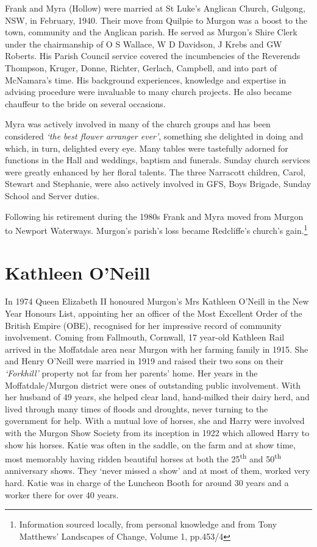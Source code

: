 Frank and Myra (Hollow) were married at St Luke's Anglican Church, Gulgong, NSW, in February, 1940. Their move from Quilpie to Murgon was a boost to the town, community and the Anglican parish. He served as Murgon's Shire Clerk under the chairmanship of O S Wallace, W D Davidson, J Krebs and GW Roberts. His Parish Council service covered the incumbencies of the Reverends Thompson, Kruger, Donne, Richter, Gerlach, Campbell, and into part of McNamara's time. His background experiences, knowledge and expertise in advising procedure were invaluable to many church projects. He also became chauffeur to the bride on several occasions.



Myra was actively involved in many of the church groups and has been considered \emph{`the best flower arranger ever'}, something she delighted in doing and which, in turn, delighted every eye. Many tables were tastefully adorned for functions in the Hall and weddings, baptism and funerals. Sunday church services were greatly enhanced by her floral talents. The three Narracott children, Carol, Stewart and Stephanie, were also actively involved in GFS, Boys Brigade, Sunday School and Server duties.



Following his retirement during the 1980s Frank and Myra moved from Murgon to Newport Waterways. Murgon's parish's loss became Redcliffe's church's gain.\footnote{Information sourced locally, from personal knowledge and from Tony Matthews' Landscapes of Change, Volume 1, pp.453/4}


\section{Kathleen O'Neill}



In 1974 Queen Elizabeth II honoured Murgon's Mrs Kathleen O'Neill in the New Year Honours List, appointing her an officer of the Most Excellent Order of the British Empire (OBE), recognised for her impressive record of community involvement. Coming from Fallmouth, Cornwall, 17 year-old Kathleen Rail arrived in the Moffatdale area near Murgon with her farming family in 1915. She and Henry O'Neill were married in 1919 and raised their two sons on their \emph{`Forkhill'} property not far from her parents' home. Her years in the Moffatdale/Murgon district were ones of outstanding public involvement. With her husband of 49 years, she helped clear land, hand-milked their dairy herd, and lived through many times of floods and droughts, never turning to the government for help. With a mutual love of horses, she and Harry were involved with the Murgon Show Society from its inception in 1922 which allowed Harry to show his horses. Katie was often in the saddle, on the farm and at show time, most memorably having ridden beautiful horses at both the 25\textsuperscript{th} and 50\textsuperscript{th} anniversary shows. They `never missed a show' and at most of them, worked very hard. Katie was in charge of the Luncheon Booth for around 30 years and a worker there for over 40 years.









